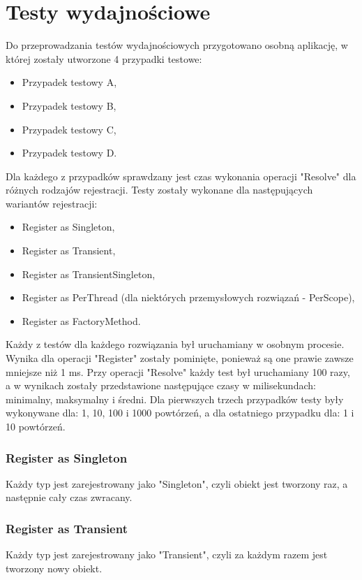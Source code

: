 \documentclass[12pt]{article}
\begin{document}
\clearpage
\section{Testy wydajnościowe}
Do przeprowadzania testów wydajnościowych przygotowano osobną aplikację, w której zostały utworzone 4 przypadki testowe:
\begin{itemize}
	\item Przypadek testowy A,
	\item Przypadek testowy B,
	\item Przypadek testowy C,
	\item Przypadek testowy D.
\end{itemize}
Dla każdego z przypadków sprawdzany jest czas wykonania operacji "Resolve" dla różnych rodzajów rejestracji. Testy zostały wykonane dla następujących wariantów rejestracji:
\begin{itemize}
	\item Register as Singleton,
	\item Register as Transient,
	\item Register as TransientSingleton,
	\item Register as PerThread (dla niektórych przemysłowych rozwiązań - PerScope),
	\item Register as FactoryMethod.
\end{itemize}
Każdy z testów dla każdego rozwiązania był uruchamiany w osobnym procesie. Wynika dla operacji "Register" zostały pominięte, ponieważ są one prawie zawsze mniejsze niż 1 ms. Przy operacji "Resolve" każdy test był uruchamiany 100 razy, a w wynikach zostały przedstawione następujące czasy w milisekundach: minimalny, maksymalny i średni. Dla pierwszych trzech przypadków testy były wykonywane dla: 1, 10, 100 i 1000 powtórzeń, a dla ostatniego przypadku dla: 1 i 10 powtórzeń.

\subsubsection{Register as Singleton}
Każdy typ jest zarejestrowany jako "Singleton", czyli obiekt jest tworzony raz, a następnie cały czas zwracany.

\subsubsection{Register as Transient}
Każdy typ jest zarejestrowany jako "Transient", czyli za każdym razem jest tworzony nowy obiekt.
\end{document}
